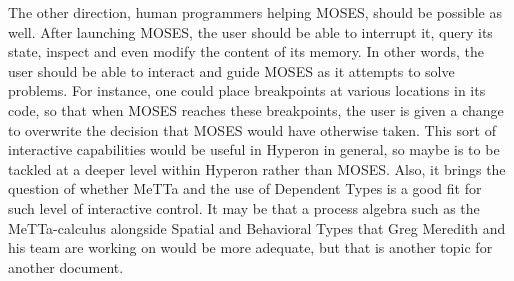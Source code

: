 \documentclass[]{report}
\begin{document}
The other direction, human programmers helping MOSES, should be
possible as well.  After launching MOSES, the user should be able to
interrupt it, query its state, inspect and even modify the content of
its memory.  In other words, the user should be able to interact and
guide MOSES as it attempts to solve problems.  For instance, one could
place breakpoints at various locations in its code, so that when MOSES
reaches these breakpoints, the user is given a change to overwrite the
decision that MOSES would have otherwise taken.  This sort of
interactive capabilities would be useful in Hyperon in general, so
maybe is to be tackled at a deeper level within Hyperon rather than
MOSES.  Also, it brings the question of whether MeTTa and the use of
Dependent Types is a good fit for such level of interactive control.
It may be that a process algebra such as the MeTTa-calculus alongside
Spatial and Behavioral Types that Greg Meredith and his team are
working on would be more adequate, but that is another topic for
another document.

 
\end{document}
